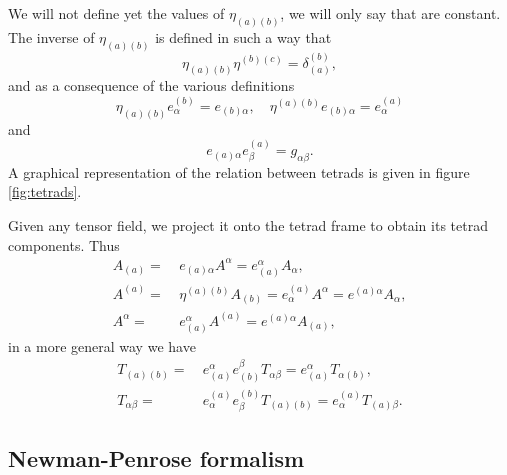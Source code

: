 We will not define yet the values of $\eta_{(a)(b)}$, we will only
say that are constant. The inverse of $\eta_{(a)(b)}$ is defined
in such a way that
\[
\eta_{(a)(b)}\eta^{(b)(c)}=\delta_{(a)}^{(b)},
\]
and as a consequence of the various definitions
\begin{equation}
\eta_{(a)(b)}e_{\alpha}^{(b)}=e_{(b)\alpha},\hspace{1em}\eta^{(a)(b)}e_{(b)\alpha}=e_{\alpha}^{(a)}
\end{equation}
and
\begin{equation}
e_{(a)\alpha}e_{\beta}^{(a)}=g_{\alpha\beta}.\label{eq:g-tetrad}
\end{equation}
A graphical representation of the relation between tetrads is given
in figure \ref{fig:tetrads}.

Given any tensor field, we project it onto the tetrad frame to obtain
its tetrad components. Thus
\begin{align*}
A_{(a)}= & \ e_{(a)\alpha}A^{\alpha}=e_{(a)}^{\alpha}A_{\alpha},\\
A^{(a)}= & \ \eta^{(a)(b)}A_{(b)}=e_{\alpha}^{(a)}A^{\alpha}=e^{(a)\alpha}A_{\alpha},\\
A^{\alpha}= & \ e_{(a)}^{\alpha}A^{(a)}=e^{(a)\alpha}A_{(a)},
\end{align*}
in a more general way we have
\begin{align*}
T_{(a)(b)}= & \ e_{(a)}^{\alpha}e_{(b)}^{\beta}T_{\alpha\beta}=e_{(a)}^{\alpha}T_{\alpha(b)},\\
T_{\alpha\beta}= & \ e_{\alpha}^{(a)}e_{\beta}^{(b)}T_{(a)(b)}=e_{\alpha}^{(a)}T_{(a)\beta}.
\end{align*}

\subsection{Newman-Penrose formalism}

